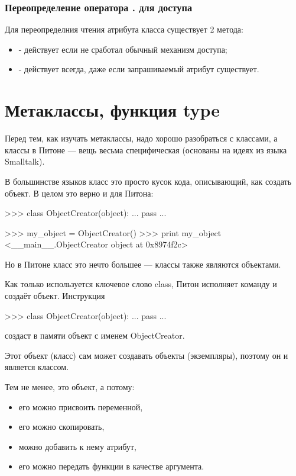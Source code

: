 \subsubsection{Переопределение оператора . для доступа}

Для переопределния чтения атрибута класса существует 2 метода: 
\begin{itemize}
    \item {} - действует если не сработал обычный механизм доступа;
    \item {} - действует всегда, даже если запрашиваемый атрибут существует.
\end{itemize}


\section{Метаклассы, функция type}

	
	Перед тем, как изучать метаклассы, надо хорошо разобраться с классами, а классы в Питоне — вещь весьма специфическая (основаны на идеях из языка Smalltalk).

В большинстве языков класс это просто кусок кода, описывающий, как создать объект. В целом это верно и для Питона:
\begin{python}
  >>> class ObjectCreator(object):
  ...       pass
  ... 

  >>> my_object = ObjectCreator()
  >>> print my_object
  <__main__.ObjectCreator object at 0x8974f2c>
  \end{python}

Но в Питоне класс это нечто большее — классы также являются объектами.

Как только используется ключевое слово class, Питон исполняет команду и создаёт объект. Инструкция
\begin{python}
  >>> class ObjectCreator(object):
  ...       pass
  ...
  \end{python}

создаст в памяти объект с именем ObjectCreator.

Этот объект (класс) сам может создавать объекты (экземпляры), поэтому он и является классом.

Тем не менее, это объект, а потому:
\begin{itemize}
	\item	его можно присвоить переменной,
	\item	его можно скопировать,
	\item	можно добавить к нему атрибут,
	\item	его можно передать функции в качестве аргумента.
\end{itemize}

